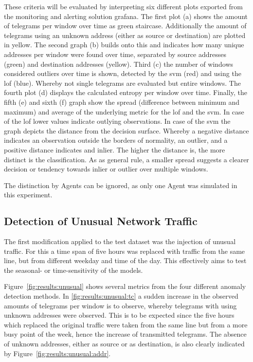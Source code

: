 These criteria will be evaluated by interpreting six different plots exported from the monitoring and alerting solution \gls{grafana}.
The first plot (a) shows the amount of telegrams per window over time as green staircase. Additionally the amount of telegrams using an unknown address (either as source or destination) are plotted in yellow.
The second graph (b) builds onto this and indicates how many unique addresses per window were found over time, separated by source addresses (green) and destination addresses (yellow).
Third (c) the number of windows considered outliers over time is shown, detected by the \gls{svm} (red) and using the \gls{lof} (blue). Whereby not single telegrams are evaluated but entire windows.
The fourth plot (d) displays the calculated entropy per window over time.
Finally, the fifth (e) and sixth (f) graph show the spread (difference between minimum and maximum) and average of the underlying metric for the \gls{lof} and the \gls{svm}.
In case of the \gls{lof} lower values indicate outlying observations. In case of the \gls{svm} the graph depicts the distance from the decision surface. Whereby a negative distance indicates an observation outside the borders of normality, an outlier, and a positive distance indicates and inlier. The higher the distance is, the more distinct is the classification.
As as general rule, a smaller spread suggests a clearer decision or tendency towards inlier or outlier over multiple windows.

The distinction by Agents can be ignored, as only one Agent was simulated in this experiment. 

\subsection{Detection of Unusual Network Traffic}
\label{sec:results:results:unusual}

The first modification applied to the test dataset was the injection of unusual traffic. 
For this a time span of five hours was replaced with traffic from the same line, but from different weekday and time of the day.
This effectively aims to test the seasonal- or time-sensitivity of the models.

Figure~\ref{fig:results:unusual} shows several metrics from the four different anomaly detection methods.
In \ref{fig:results:unusual:tc} a sudden increase in the observed amounts of telegrams per window is to observe, whereby telegrams with using unknown addresses were observed. This is to be expected since the five hours which replaced the original traffic were taken from the same line but from a more busy point of the week, hence the increase of transmitted telegrams.
The absence of unknown addresses, either as source or as destination, is also clearly indicated by Figure~\ref{fig:results:unusual:addr}.

